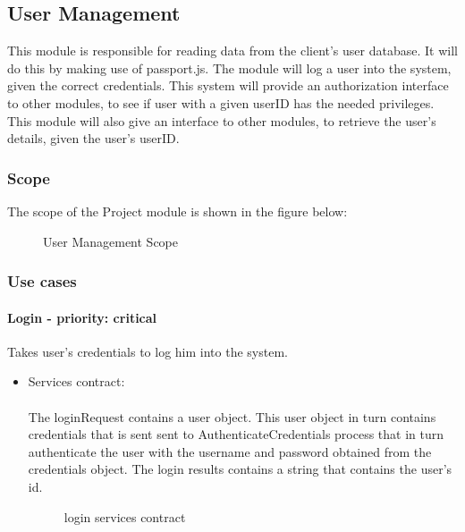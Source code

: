 \subsection{User Management}
This module is responsible for reading data from the client's user database. It will do this by making use of passport.js. The module will log a user into the system, given the correct credentials. This system will provide an authorization interface to other modules, to see if user with a given userID has the needed privileges. This module will also give an interface to other modules, to retrieve the user's details, given the user's userID. 

\subsubsection{Scope}
The scope of the Project module is shown in the figure below:
	\begin{figure}[H]
	    	\centering
	    	\caption{User Management Scope}
	    	\label{fig:UserManagementScope}
   	\end{figure}
\subsubsection{Use cases}

\paragraph{Login - priority: critical}
Takes user's credentials to log him into the system.

\begin{itemize}
	\item Services contract:\\ \\
	The loginRequest contains a user object. This user object in turn contains credentials that is sent sent to AuthenticateCredentials process that in turn authenticate the user with the username and password obtained from the credentials object. The login results contains a string that contains the user's id.
	\begin{figure}[H]
    	\centering
    	\caption{login services contract}
    	\label{fig:login_services_contract}
   	\end{figure}
\end{itemize}

